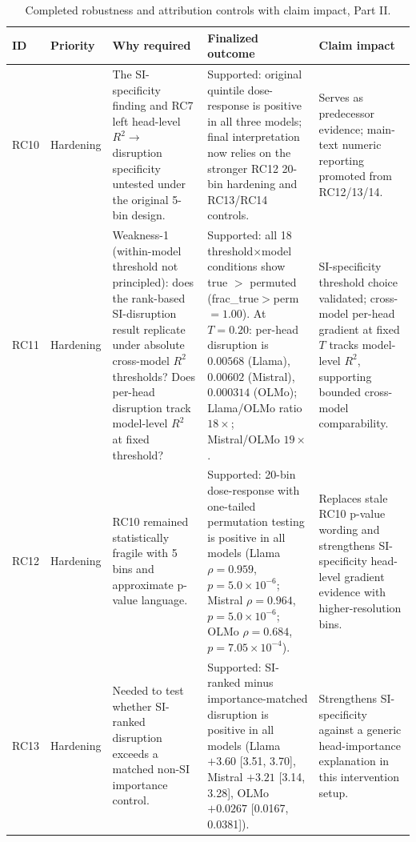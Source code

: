 \documentclass{article}
\begin{document}
\begin{table}[htbp]
\centering
\scriptsize
\setlength{\tabcolsep}{3pt}
\caption{Completed robustness and attribution controls with claim impact, Part II.}
\begin{tabular}{p{1.1cm}p{1.5cm}p{3.4cm}p{3.7cm}p{2.5cm}}
\toprule
ID & Priority & Why required & Finalized outcome & Claim impact \\
\midrule

RC10 & Hardening & The SI-specificity finding and RC7 left head-level $R^2 \to$ disruption specificity untested under the original 5-bin design. & Supported: original quintile dose-response is positive in all three models; final interpretation now relies on the stronger RC12 20-bin hardening and RC13/RC14 controls. & Serves as predecessor evidence; main-text numeric reporting promoted from RC12/13/14. \\

RC11 & Hardening & Weakness-1 (within-model threshold not principled): does the rank-based SI-disruption result replicate under absolute cross-model $R^2$ thresholds? Does per-head disruption track model-level $R^2$ at fixed threshold? & Supported: all 18 threshold$\times$model conditions show true $>$ permuted (frac\_true$>$perm $= 1.00$). At $T{=}0.20$: per-head disruption is $0.00568$ (Llama), $0.00602$ (Mistral), $0.000314$ (OLMo); Llama/OLMo ratio $18{\times}$; Mistral/OLMo $19{\times}$. & SI-specificity threshold choice validated; cross-model per-head gradient at fixed $T$ tracks model-level $R^2$, supporting bounded cross-model comparability. \\

RC12 & Hardening & RC10 remained statistically fragile with 5 bins and approximate p-value language. & Supported: 20-bin dose-response with one-tailed permutation testing is positive in all models (Llama $\rho=0.959$, $p=5.0\times10^{-6}$; Mistral $\rho=0.964$, $p=5.0\times10^{-6}$; OLMo $\rho=0.684$, $p=7.05\times10^{-4}$). & Replaces stale RC10 p-value wording and strengthens SI-specificity head-level gradient evidence with higher-resolution bins. \\

RC13 & Hardening & Needed to test whether SI-ranked disruption exceeds a matched non-SI importance control. & Supported: SI-ranked minus importance-matched disruption is positive in all models (Llama $+3.60$ [3.51, 3.70], Mistral $+3.21$ [3.14, 3.28], OLMo $+0.0267$ [0.0167, 0.0381]). & Strengthens SI-specificity against a generic head-importance explanation in this intervention setup. \\


\end{tabular}
\end{table}
\end{document}

